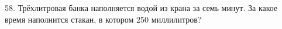 58. Трёхлитровая банка наполняется водой из крана за семь минут. За какое время наполнится стакан, в котором 250 миллилитров?\\
